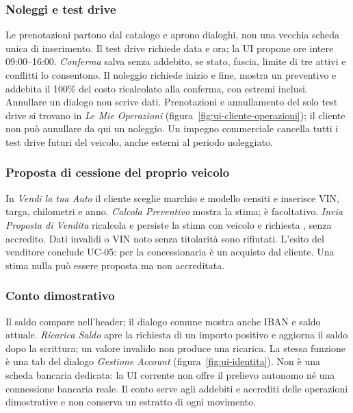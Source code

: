 \subsubsection{Noleggi e test drive}
Le prenotazioni partono dal catalogo e aprono dialoghi, non una vecchia
scheda unica di inserimento. Il test drive richiede data e ora; la UI
propone ore intere 09:00--16:00. \emph{Conferma} salva senza addebito,
se stato, fascia, limite di tre attivi e conflitti lo consentono.
Il noleggio richiede inizio e fine, mostra un preventivo e addebita il
100\% del costo ricalcolato alla conferma, con estremi inclusi.
Annullare un dialogo non scrive dati. Prenotazioni e annullamento del solo
test drive si trovano in \emph{Le Mie Operazioni}
(figura~\ref{fig:ui-cliente-operazioni}); il cliente non può annullare da
qui un noleggio. Un impegno commerciale cancella tutti i test drive futuri
del veicolo, anche esterni al periodo noleggiato.
\clearpage

\subsubsection{Proposta di cessione del proprio veicolo}
In \emph{Vendi la tua Auto} il cliente sceglie marchio e modello censiti e
inserisce VIN, targa, chilometri e anno. \emph{Calcola Preventivo} mostra la
stima; è facoltativo. \emph{Invia Proposta di Vendita} ricalcola e persiste
la stima con veicolo  e richiesta , senza
accredito. Dati invalidi o VIN noto senza titolarità sono rifiutati.
L'esito del venditore conclude UC-05: per la concessionaria è un acquisto
dal cliente. Una stima nulla può essere proposta ma non accreditata.

\subsubsection{Conto dimostrativo}
Il saldo compare nell'header; il dialogo comune mostra anche IBAN e saldo attuale. \emph{Ricarica Saldo} apre la richiesta di un
importo positivo e aggiorna il saldo dopo la scrittura; un valore invalido
non produce una ricarica. La stessa funzione è una tab del dialogo
\emph{Gestione Account} (figura~\ref{fig:ui-identita}). Non è una scheda
bancaria dedicata: la UI corrente non offre il prelievo autonomo né una
connessione bancaria reale. Il conto serve agli addebiti e accrediti
delle operazioni dimostrative e non conserva un estratto di ogni movimento.

